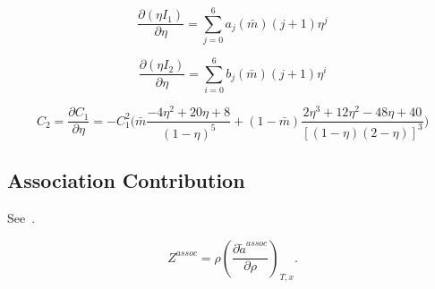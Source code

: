 \documentclass[12pt, letterpaper]{article}
\begin{document}
\begin{equation}
    \frac{\partial(\eta I_{1})}{\partial\eta}=\sum_{j=0}^6a_{j}(\bar{m})(j+1)\eta^j
    \label{eq:deta_i1_deta}
\end{equation}


\begin{equation}
    \frac{\partial(\eta I_{2})}{\partial\eta}=\sum_{i=0}^6b_{j}(\bar{m})(j+1)\eta^i
    \label{eq:deta_i2_deta}
\end{equation}


\begin{equation}
    C_{2}
    =\frac{\partial C_{1}}{\partial\eta}
    =- C_{1}^{2}\biggl(
    \bar{m}\frac{-4\eta^{2}+20\eta+8}{\left(1-\eta\right)^{5}}
    +(1-\bar{m})\frac{2\eta^{3}+12\eta^{2}-48\eta+40}{\left[(1-\eta)(2-\eta)\right]^{3}}
    \biggr)
    \label{eq:c2_disp}
\end{equation}

\subsection{Association Contribution}

See~\cite{Chapman1990}.

\begin{equation}
    Z^{assoc} =\rho\left(\frac{\partial\tilde{a}^{assoc}}{\partial\rho}\right)_{T,x}
    .
    \label{eq:z_assoc}
\end{equation}

\end{document}

